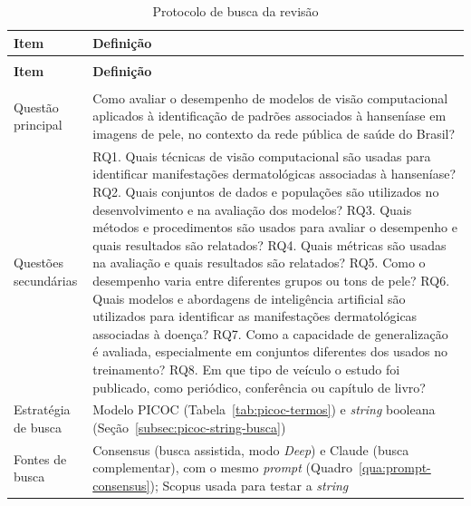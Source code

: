 \begingroup
\footnotesize
\setlength{\tabcolsep}{4pt}
\renewcommand{\arraystretch}{1.15}
\begin{longtable}{|>{\raggedright\arraybackslash}p{3.0cm}|>{\raggedright\arraybackslash}p{12.0cm}|}
	\caption{Protocolo de busca da revisão}\label{tab:protocolo-busca} \\
	\hline
	\textbf{Item} & \textbf{Definição} \\
	\hline
	\endfirsthead
	\multicolumn{2}{l}{\footnotesize\textit{Tabela~\ref{tab:protocolo-busca} (continuação)}} \\
	\hline
	\textbf{Item} & \textbf{Definição} \\
	\hline
	\endhead
	\hline
	\multicolumn{2}{r}{\footnotesize\textit{continua na próxima página}} \\
	\endfoot
	\hline
	\endlastfoot
	Questão principal & Como avaliar o desempenho de modelos de visão computacional aplicados à identificação de padrões associados à hanseníase em imagens de pele, no contexto da rede pública de saúde do Brasil? \\
	\hline
	Questões secundárias &
	RQ1. Quais técnicas de visão computacional são usadas para identificar manifestações dermatológicas associadas à hanseníase?\newline
	RQ2. Quais conjuntos de dados e populações são utilizados no desenvolvimento e na avaliação dos modelos?\newline
	RQ3. Quais métodos e procedimentos são usados para avaliar o desempenho e quais resultados são relatados?\newline
	RQ4. Quais métricas são usadas na avaliação e quais resultados são relatados?\newline
	RQ5. Como o desempenho varia entre diferentes grupos ou tons de pele?\newline
	RQ6. Quais modelos e abordagens de inteligência artificial são utilizados para identificar as manifestações dermatológicas associadas à doença?\newline
	RQ7. Como a capacidade de generalização é avaliada, especialmente em conjuntos diferentes dos usados no treinamento?\newline
	RQ8. Em que tipo de veículo o estudo foi publicado, como periódico, conferência ou capítulo de livro? \\
	\hline
	Estratégia de busca & Modelo PICOC (Tabela~\ref{tab:picoc-termos}) e \textit{string} booleana (Seção~\ref{subsec:picoc-string-busca}) \\
	\hline
	Fontes de busca & Consensus (busca assistida, modo \textit{Deep}) e Claude (busca complementar), com o mesmo \textit{prompt} (Quadro~\ref{qua:prompt-consensus}); Scopus usada para testar a \textit{string} \\

\end{longtable}
